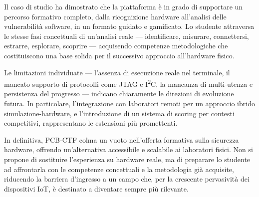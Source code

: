 Il caso di studio ha dimostrato che la piattaforma è in grado di supportare un percorso formativo completo, dalla ricognizione hardware all'analisi delle vulnerabilità software, in un formato guidato e gamificato. Lo studente attraversa le stesse fasi concettuali di un'analisi reale --- identificare, misurare, connettersi, estrarre, esplorare, scoprire --- acquisendo competenze metodologiche che costituiscono una base solida per il successivo approccio all'hardware fisico.

Le limitazioni individuate --- l'assenza di esecuzione reale nel terminale, il mancato supporto di protocolli come JTAG e I\textsuperscript{2}C, la mancanza di multi-utenza e persistenza del progresso --- indicano chiaramente le direzioni di evoluzione futura. In particolare, l'integrazione con laboratori remoti per un approccio ibrido simulazione-hardware, e l'introduzione di un sistema di scoring per contesti competitivi, rappresentano le estensioni più promettenti.

In definitiva, PCB-CTF colma un vuoto nell'offerta formativa sulla sicurezza hardware, offrendo un'alternativa accessibile e scalabile ai laboratori fisici. Non si propone di sostituire l'esperienza su hardware reale, ma di preparare lo studente ad affrontarla con le competenze concettuali e la metodologia già acquisite, riducendo la barriera d'ingresso a un campo che, per la crescente pervasività dei dispositivi IoT, è destinato a diventare sempre più rilevante.
